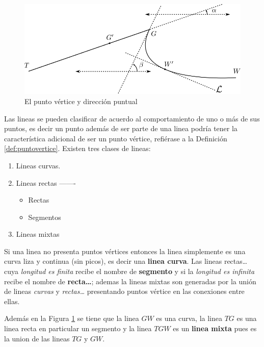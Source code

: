 \documentclass[
  16pt,
]{krantz}
\providecommand{\tightlist}{%
  \setlength{\itemsep}{0pt}\setlength{\parskip}{0pt}}
\theoremstyle{definition}
\theoremstyle{definition}
\theoremstyle{definition}
\theoremstyle{definition}
\theoremstyle{remark}
\begin{document}
\begin{figure}[!ht]

{\centering \includegraphics{tangente} 

}

\caption{El punto vértice y dirección puntual}\label{fig:tangente}
\end{figure}

Las lineas se pueden clasificar de acuerdo al comportamiento de uno o más de sus puntos, es decir un punto además de ser parte de una linea podría tener la característica adicional de ser un punto vértice, refiérase a la Definición \ref{def:puntovertice}. Existen tres clases de lineas:

\begin{enumerate}
\def\labelenumi{\arabic{enumi}.}
\item
  Lineas curvas.
\item
  Lineas rectas -------

  \begin{itemize}
  \tightlist
  \item
    Rectas
  \item
    Segmentos
  \end{itemize}
\item
  Lineas mixtas
\end{enumerate}

Si una linea no presenta puntos vértices entonces la linea simplemente es una curva liza y continua (sin picos), es decir una \textbf{linea curva}. Las lineas rectas\ldots{} cuya \emph{longitud es finita} recibe el nombre de \textbf{segmento} y si la \emph{longitud es infinita} recibe el nombre de \textbf{recta\ldots{}}; ademas la lineas mixtas son generadas por la unión de lineas \emph{curvas} y \emph{rectas\ldots{}} presentando puntos vértice en las conexiones entre ellas.

Además en la Figura \ref{fig:tangente} se tiene que la linea \(GW\) es una curva, la linea \(TG\) es una linea recta en particular un segmento y la linea \(TGW\) es un \textbf{linea mixta} pues es la union de las lineas \(TG\) y \(GW\).
\end{document}
